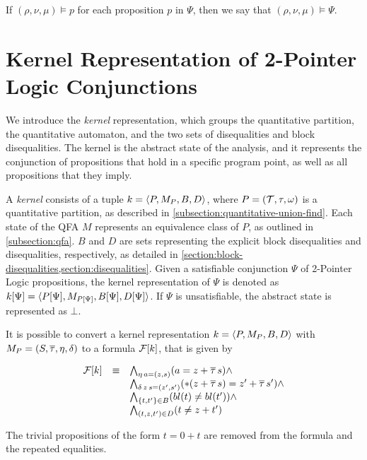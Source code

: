 If $(\rho, \nu, \mu)\models p$ for each proposition $p$ in $\Psi$, then we say that $(\rho, \nu, \mu) \models \Psi$.





\section{Kernel Representation of 2-Pointer Logic Conjunctions}

We introduce the \emph{kernel} representation, which groups the quantitative partition, the quantitative automaton, and the two sets of disequalities and block disequalities.
The kernel is the abstract state of the analysis, and it represents the conjunction of propositions that hold in a specific program point, as well as all propositions that they imply.

A \emph{kernel} consists of a tuple $k = \langle P,M_P,B,D\rangle$, where $P = (\mathcal{T}, \tau, \omega)$ is a quantitative partition, as described in \cref{subsection:quantitative-union-find}.
Each state of the QFA $M$ represents an equivalence class of $P$, as outlined in \cref{subsection:qfa}.
$B$ and $D$ are sets representing the explicit block disequalities and disequalities, respectively, as detailed in \cref{section:block-disequalities,section:disequalities}.
Given a satisfiable conjunction $\Psi$ of 2-Pointer Logic propositions, the kernel representation of $\Psi$ is denoted as $k[\Psi] = \langle P[\Psi],M_{P[\Psi]},B[\Psi],D[\Psi]\rangle$.
If $\Psi$ is unsatisfiable, the abstract state is represented as $\bot$.

It is possible to convert a kernel representation $k = \langle P,M_P,B,D\rangle$ with $M_P = (S, \overline{\tau}, \eta, \delta)$ to a formula $\mathcal{F}[k]$, that is given by

\[
  \begin{array}{lll}
    \mathcal{F}[k] & \equiv & \bigwedge_{\eta\,a=(z,s)} (a = z + \overline{\tau}\,s) \land                            \\
          &        & \bigwedge_{\delta\,z\,s=(z',s')} (*(z + \overline{\tau}\,s) = z' + \overline{\tau}\,s') \land     \\
          &        & \bigwedge_{\{t,t'\}\in B} (bl(t) \neq bl(t')) \land \\
          &        & \bigwedge_{(t,z, t') \in D}(t \neq z + t')
  \end{array}
\]

The trivial propositions of the form $t = 0 + t$ are removed from the formula and the repeated equalities.

